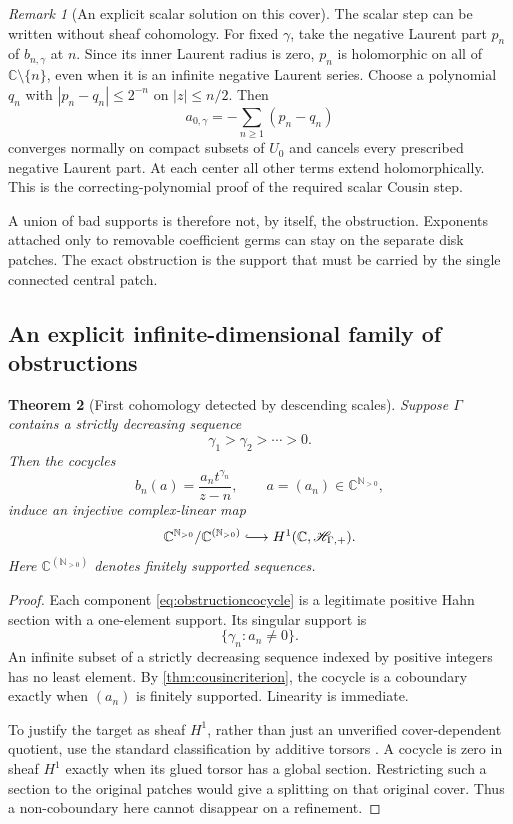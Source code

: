 \documentclass[11pt,letterpaper]{article}
\newtheorem{theorem}{Theorem}[section]
\theoremstyle{definition}
\theoremstyle{remark}
\newtheorem{remark}[theorem]{Remark}
\newcommand{\C}{\mathbb C}
\newcommand{\N}{\mathbb N}
\newcommand{\HP}{\mathscr H_{\Gamma,+}}
\numberwithin{equation}{section}
\begin{document}
\begin{remark}[An explicit scalar solution on this cover]\label{rem:explicitCousin}
The scalar step can be written without sheaf cohomology. For fixed $\gamma$, take the negative Laurent part $p_n$ of $b_{n,\gamma}$ at $n$. Since its inner Laurent radius is zero, $p_n$ is holomorphic on all of $\C\setminus\{n\}$, even when it is an infinite negative Laurent series. Choose a polynomial $q_n$ with $|p_n-q_n|\le2^{-n}$ on $|z|\le n/2$. Then
\[
 a_{0,\gamma}=-\sum_{n\ge1}(p_n-q_n)
\]
converges normally on compact subsets of $U_0$ and cancels every prescribed negative Laurent part. At each center all other terms extend holomorphically. This is the correcting-polynomial proof of the required scalar Cousin step.
\end{remark}

A union of bad supports is therefore not, by itself, the obstruction. Exponents attached only to removable coefficient germs can stay on the separate disk patches. The exact obstruction is the support that must be carried by the single connected central patch.

\subsection{An explicit infinite-dimensional family of obstructions}
\begin{theorem}[First cohomology detected by descending scales]\label{thm:H1injection}
Suppose $\Gamma$ contains a strictly decreasing sequence
\[
 \gamma_1>\gamma_2>\cdots>0.
\]
Then the cocycles
\begin{equation}\label{eq:obstructioncocycle}
 b_n(a)=\frac{a_n t^{\gamma_n}}{z-n},\qquad a=(a_n)\in\C^{\N_{>0}},
\end{equation}
induce an injective complex-linear map
\begin{equation}\label{eq:cohomologyinjection}
 \C^{\N_{>0}}/\C^{(\N_{>0})}
 \lhook\joinrel\longrightarrow H^1(\C,\HP).
\end{equation}
Here $\C^{(\N_{>0})}$ denotes finitely supported sequences.
\end{theorem}
\begin{proof}
Each component \eqref{eq:obstructioncocycle} is a legitimate positive Hahn section with a one-element support. Its singular support is
\[
 \{\gamma_n:a_n\ne0\}.
\]
An infinite subset of a strictly decreasing sequence indexed by positive integers has no least element. By \cref{thm:cousincriterion}, the cocycle is a coboundary exactly when $(a_n)$ is finitely supported. Linearity is immediate.

To justify the target as sheaf $H^1$, rather than just an unverified cover-dependent quotient, use the standard classification by additive torsors \cite[Tag~02FQ]{Stacks}. A cocycle is zero in sheaf $H^1$ exactly when its glued torsor has a global section. Restricting such a section to the original patches would give a splitting on that original cover. Thus a non-coboundary here cannot disappear on a refinement.
\end{proof}
\end{document}
